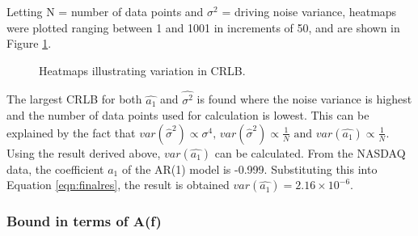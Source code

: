 \noindent
Letting N = number of data points and $\sigma^{2}$ = driving noise variance, heatmaps were plotted ranging between 1 and 1001 in increments of 50, and are shown in Figure \ref{fig:heatmaps}.

\begin{figure}[H]
    \centering
    \caption{Heatmaps illustrating variation in CRLB.}
    \label{fig:heatmaps}
\end{figure}

\noindent
The largest CRLB for both $\hat{a_{1}}$ and $\hat{\sigma^{2}}$ is found where the noise variance is highest and the number of data points used for calculation is lowest. This can be explained by the fact that $
\textit{var}\left(\hat{\sigma}^{2}\right) \propto \sigma^{4} \text {,  } \textit{var}\left(\hat{\sigma}^{2}\right) \propto \frac{1}{N} \text { and } \textit{var}\left(\hat{a_{1}}\right) \propto \frac{1}{N}
$. Using the result derived above, $var(\hat{a_{1}})$ can be calculated. From the NASDAQ data, the coefficient $a_{1}$ of the AR(1) model is -0.999. Substituting this into Equation \ref{eqn:finalres}, the result is obtained $var(\hat{a_{1}}) = 2.16 \times 10^{−6}$.

\subsubsection{Bound in terms of A(f)}

